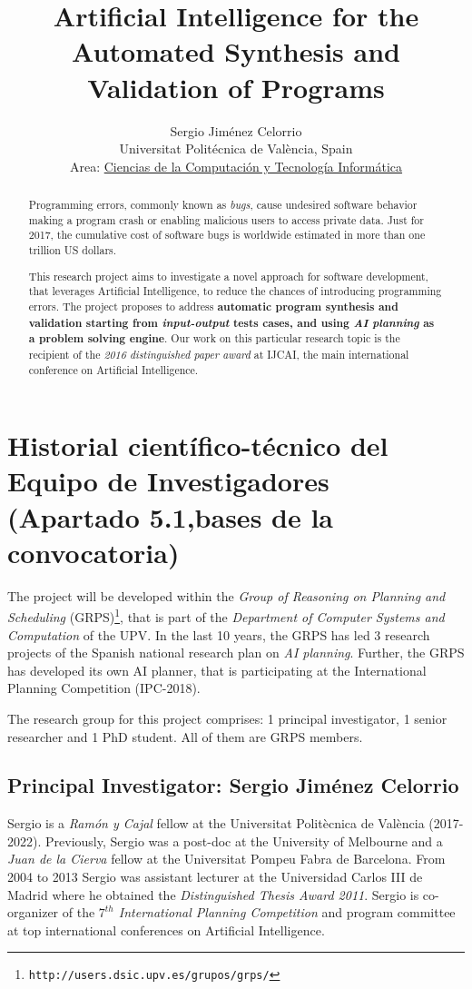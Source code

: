 \documentclass[10pt,a4paper]{paper}
\title{Artificial Intelligence for the Automated Synthesis and Validation of Programs}
\author{Sergio Jim\'enez Celorrio\\
\footnotesize Universitat Politécnica de València, Spain\\
\small Area: \underline{Ciencias de la Computación y Tecnología Informática}}
\begin{document}
\maketitle

\begin{abstract}
Programming errors, commonly known as {\em bugs}, cause undesired software behavior making a program crash or enabling malicious users to access private data. Just for 2017, the cumulative cost of software bugs is worldwide estimated in more than one trillion US dollars. 

This research project aims to investigate a novel approach for software development, that leverages Artificial Intelligence, to reduce the chances of introducing programming errors. The project proposes to address {\bf automatic program synthesis and validation starting from {\em input-output} tests cases, and using {\em AI planning} as a problem solving engine}. Our work on this particular research topic is the recipient of the {\em 2016 distinguished paper award} at {\sc IJCAI}, the main international conference on Artificial Intelligence.
\end{abstract}

\newpage

\section{Historial científico-técnico del Equipo de Investigadores (Apartado 5.1,bases de la convocatoria)}

The project will be developed within the {\em Group of Reasoning on Planning and Scheduling} (GRPS){\footnote{\tt http://users.dsic.upv.es/grupos/grps/}}, that is part of the {\em Department of Computer Systems and Computation} of the UPV. In the last 10 years, the GRPS has led 3 research projects of the Spanish national research plan on {\em AI planning}. Further, the GRPS has developed its own AI planner, that is participating  at the International Planning Competition (IPC-2018).

The research group for this project comprises: 1 principal investigator, 1 senior researcher and 1 PhD student. All of them are GRPS members. 

\subsection{Principal Investigator: Sergio Jiménez Celorrio}
Sergio is a {\em Ramón y Cajal} fellow at the Universitat Politècnica de València (2017-2022). Previously, Sergio was a post-doc at the University of Melbourne and a {\em Juan de la Cierva} fellow at the Universitat Pompeu Fabra de Barcelona. From 2004 to 2013 Sergio was assistant lecturer at the Universidad Carlos III de Madrid where he obtained the {\em Distinguished Thesis Award 2011}. Sergio is co-organizer of the {\em $7^{th}$ International Planning Competition} and program committee at top international conferences on Artificial Intelligence.
\end{document}
